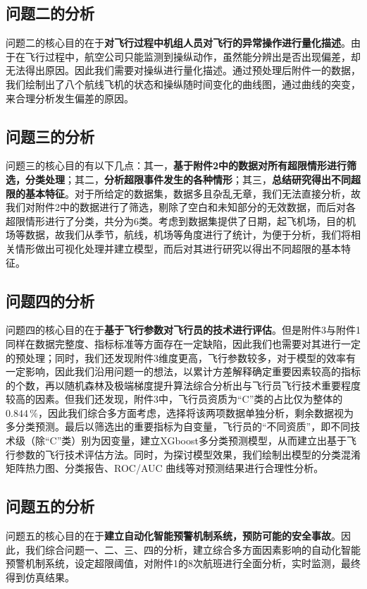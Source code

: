 \documentclass{MathorCupModeling}
\begin{document}
	\subsection{问题二的分析}
	问题二的核心目的在于\textbf{对飞行过程中机组人员对飞行的异常操作进行量化描述}。由于在飞行过程中，航空公司只能监测到操纵动作，虽然能分辨出是否出现偏差，却无法得出原因。因此我们需要对操纵进行量化描述。通过预处理后附件一的数据，我们绘制出了八个航线飞机的状态和操纵随时间变化的曲线图，通过曲线的突变，来合理分析发生偏差的原因。
	\subsection{问题三的分析}
	问题三的核心目的有以下几点：{\heiti 其一}，\textbf{基于附件2中的数据对所有超限情形进行筛选，分类处理}；{\heiti 其二}，\textbf{分析超限事件发生的各种情形}；{\heiti 其三}，\textbf{总结研究得出不同超限的基本特征}。对于所给定的数据集，数据多且杂乱无章，我们无法直接分析，故我们对附件2中的数据进行了筛选，剔除了空白和未知部分的无效数据，而后对各超限情形进行了分类，共分为6类。考虑到数据集提供了日期，起飞机场，目的机场等数据，故我们从季节，航线，机场等角度进行了统计，为便于分析，我们将相关情形做出可视化处理并建立模型，而后对其进行研究以得出不同超限的基本特征。
	\subsection{问题四的分析}
	问题四的核心目的在于\textbf{基于飞行参数对飞行员的技术进行评估}。但是附件3与附件1同样在数据完整度、指标标准等方面存在一定缺陷，因此我们也需要对其进行一定的预处理；同时，我们还发现附件3维度更高，飞行参数较多，对于模型的效率有一定影响，因此我们沿用问题一的想法，以累计方差解释确定重要因素较高的指标的个数，再以随机森林及极端梯度提升算法综合分析出与飞行员飞行技术重要程度较高的因素。但我们还发现，附件3中，飞行员资质为“C”类的占比仅为整体的$0.844\,\%$，因此我们综合多方面考虑，选择将该两项数据单独分析，剩余数据视为多分类预测。最后以筛选出的重要指标为自变量，飞行员的“不同资质”，即不同技术级（除“C”类）别为因变量，建立XGboost多分类预测模型，从而建立出基于飞行参数的飞行技术评估方法。同时，为探讨模型效果，我们绘制出模型的{\heiti 分类混淆矩阵热力图}、{\heiti 分类报告}、{\heiti ROC/AUC	曲线}等对预测结果进行合理性分析。
	\subsection{问题五的分析}
	问题五的核心目的在于\textbf{建立自动化智能预警机制系统，预防可能的安全事故}。因此，我们综合问题一、二、三、四的分析，建立综合多方面因素影响的自动化智能预警机制系统，设定超限阈值，对附件1的8次航班进行全面分析，实时监测，最终得到仿真结果。
\end{document}
